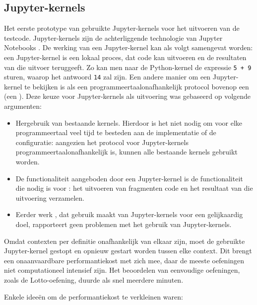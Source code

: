 \subsection{Jupyter-kernels}\label{subsec:jupyter-kernels}

Het eerste prototype van \tested{} gebruikte Jupyter-kernels voor het uitvoeren van de testcode.
Jupyter-kernels zijn de achterliggende technologie van Jupyter Notebooks \autocite{jupyter2016}.
De werking van een Jupyter-kernel kan als volgt samengevat worden: een Jupyter-kernel is een lokaal proces, dat code kan uitvoeren en de resultaten van die uitvoer teruggeeft.
Zo kan men naar de Python-kernel de expressie \texttt{5 + 9} sturen, waarop het antwoord \texttt{14} zal zijn.
Een andere manier om een Jupyter-kernel te bekijken is als een programmeertaalonafhankelijk protocol bovenop een  (een ).
Deze keuze voor Jupyter-kernels als uitvoering was gebaseerd op volgende argumenten:
\begin{itemize}
    \item Hergebruik van bestaande kernels.
    Hierdoor is het niet nodig om voor elke programmeertaal veel tijd te besteden aan de implementatie of de configuratie: aangezien het protocol voor Jupyter-kernels programmeertaalonafhankelijk is, kunnen alle bestaande kernels gebruikt worden.
    \item De functionaliteit aangeboden door een Jupyter-kernel is de functionaliteit die nodig is voor \tested{}: het uitvoeren van fragmenten code en het resultaat van die uitvoering verzamelen.
    \item Eerder werk \autocite{petegem2018}, dat gebruik maakt van Jupyter-kernels voor een gelijkaardig doel, rapporteert geen problemen met het gebruik van Jupyter-kernels.
\end{itemize}

Omdat contexten per definitie onafhankelijk van elkaar zijn, moet de gebruikte Jupyter-kernel gestopt en opnieuw gestart worden tussen elke context.
Dit brengt een onaanvaardbare performantiekost met zich mee, daar de meeste oefeningen niet computationeel intensief zijn.
Het beoordelen van eenvoudige oefeningen, zoals de Lotto-oefening, duurde als snel meerdere minuten.

Enkele ideeën om de performantiekost te verkleinen waren:

